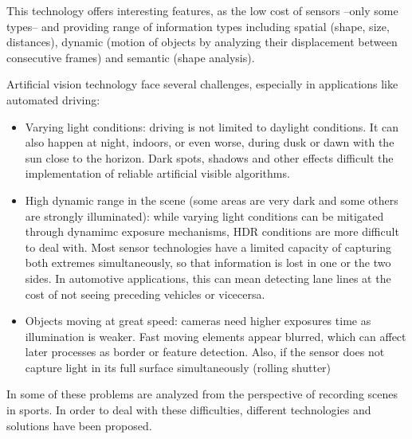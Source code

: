 This technology offers interesting features, as the low cost of sensors --only 
some types-- and providing range of information types including spatial
(shape, size, distances), dynamic (motion of objects by analyzing their 
displacement between consecutive frames) and semantic (shape analysis).

Artificial vision technology face several challenges, especially in 
applications like automated driving:

\begin{itemize}
    \item Varying light conditions: driving is not limited to daylight 
    conditions. It can also happen at night, indoors, or even worse,
    during dusk or dawn with the sun close to the horizon. Dark spots,
    shadows and other effects difficult the implementation of reliable 
    artificial visible algorithms.
    
    \item High dynamic range in the scene (some areas are very dark 
    and some others are strongly illuminated): while varying light conditions
    can be mitigated through dynamimc exposure mechanisms, HDR conditions
    are more difficult to deal with. Most sensor technologies have a 
    limited capacity of capturing both extremes simultaneously, so that 
    information is lost in one or the two sides. In automotive applications, 
    this can mean detecting lane lines at the cost of not seeing preceding
    vehicles or vicecersa.
    
    
    \item Objects moving at great speed: cameras need higher exposures time as
    illumination is weaker. Fast moving elements appear blurred, which can 
    affect later processes as border or feature detection. Also, if the sensor
    does not capture light in its full surface simultaneously (rolling shutter)
\end{itemize}

In \cite{Pueo2016} some of these problems are analyzed from the perspective of
recording scenes in sports.
In order to deal with these difficulties, different technologies and solutions 
have been proposed. 

